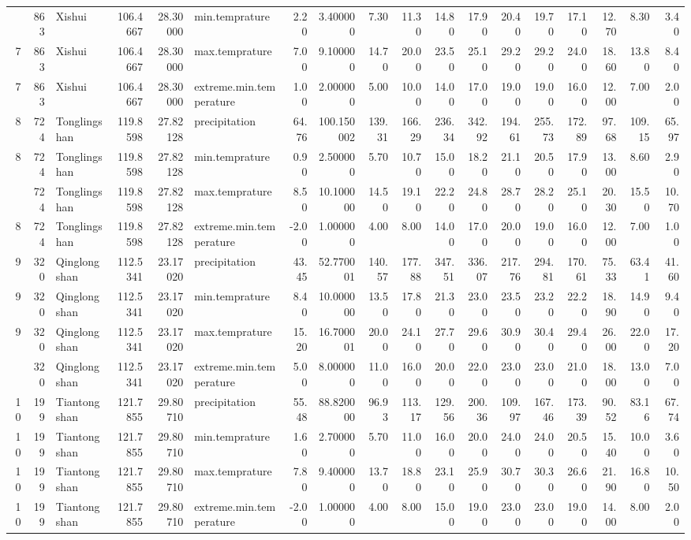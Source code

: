 \documentclass[
]{ctexart}
\begin{document}
\begin{table}
{\begin{tabular}{rrlrrlrrrrrrrrrrrr}
\addlinespace
7 & 863 & Xishui & 106.4667 & 28.30000 & min.temprature & 2.20 & 3.400000 & 7.30 & 11.30 & 14.80 & 17.90 & 20.40 & 19.70 & 17.10 & 12.70 & 8.30 & 3.40\\
7 & 863 & Xishui & 106.4667 & 28.30000 & max.temprature & 7.00 & 9.100000 & 14.70 & 20.00 & 23.50 & 25.10 & 29.20 & 29.20 & 24.00 & 18.60 & 13.80 & 8.40\\
7 & 863 & Xishui & 106.4667 & 28.30000 & extreme.min.temperature & 1.00 & 2.000000 & 5.00 & 10.00 & 14.00 & 17.00 & 19.00 & 19.00 & 16.00 & 12.00 & 7.00 & 2.00\\
8 & 724 & Tonglingshan & 119.8598 & 27.82128 & precipitation & 64.76 & 100.150002 & 139.31 & 166.29 & 236.34 & 342.92 & 194.61 & 255.73 & 172.89 & 97.68 & 109.15 & 65.97\\
8 & 724 & Tonglingshan & 119.8598 & 27.82128 & min.temprature & 0.90 & 2.500000 & 5.70 & 10.70 & 15.00 & 18.20 & 21.10 & 20.50 & 17.90 & 13.00 & 8.60 & 2.90\\
\addlinespace
8 & 724 & Tonglingshan & 119.8598 & 27.82128 & max.temprature & 8.50 & 10.100000 & 14.50 & 19.10 & 22.20 & 24.80 & 28.70 & 28.20 & 25.10 & 20.30 & 15.50 & 10.70\\
8 & 724 & Tonglingshan & 119.8598 & 27.82128 & extreme.min.temperature & -2.00 & 1.000000 & 4.00 & 8.00 & 14.00 & 17.00 & 20.00 & 19.00 & 16.00 & 12.00 & 7.00 & 1.00\\
9 & 320 & Qinglongshan & 112.5341 & 23.17020 & precipitation & 43.45 & 52.770001 & 140.57 & 177.88 & 347.51 & 336.07 & 217.76 & 294.81 & 170.61 & 75.33 & 63.41 & 41.60\\
9 & 320 & Qinglongshan & 112.5341 & 23.17020 & min.temprature & 8.40 & 10.000000 & 13.50 & 17.80 & 21.30 & 23.00 & 23.50 & 23.20 & 22.20 & 18.90 & 14.90 & 9.40\\
9 & 320 & Qinglongshan & 112.5341 & 23.17020 & max.temprature & 15.20 & 16.700001 & 20.00 & 24.10 & 27.70 & 29.60 & 30.90 & 30.40 & 29.40 & 26.00 & 22.00 & 17.20\\
\addlinespace
9 & 320 & Qinglongshan & 112.5341 & 23.17020 & extreme.min.temperature & 5.00 & 8.000000 & 11.00 & 16.00 & 20.00 & 22.00 & 23.00 & 23.00 & 21.00 & 18.00 & 13.00 & 7.00\\
10 & 199 & Tiantongshan & 121.7855 & 29.80710 & precipitation & 55.48 & 88.820000 & 96.93 & 113.17 & 129.56 & 200.36 & 109.97 & 167.46 & 173.39 & 90.52 & 83.16 & 67.74\\
10 & 199 & Tiantongshan & 121.7855 & 29.80710 & min.temprature & 1.60 & 2.700000 & 5.70 & 11.00 & 16.00 & 20.00 & 24.00 & 24.00 & 20.50 & 15.40 & 10.00 & 3.60\\
10 & 199 & Tiantongshan & 121.7855 & 29.80710 & max.temprature & 7.80 & 9.400000 & 13.70 & 18.80 & 23.10 & 25.90 & 30.70 & 30.30 & 26.60 & 21.90 & 16.80 & 10.50\\
10 & 199 & Tiantongshan & 121.7855 & 29.80710 & extreme.min.temperature & -2.00 & 1.000000 & 4.00 & 8.00 & 15.00 & 19.00 & 23.00 & 23.00 & 19.00 & 14.00 & 8.00 & 2.00\\
\bottomrule
\end{tabular}}
\end{table}
\end{document}
